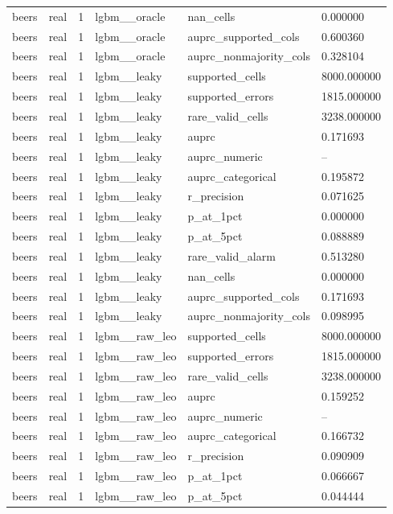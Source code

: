 \begin{tabular}{llllll}
beers & real & 1 & lgbm\_\_oracle & nan\_cells & 0.000000 \\
beers & real & 1 & lgbm\_\_oracle & auprc\_supported\_cols & 0.600360 \\
beers & real & 1 & lgbm\_\_oracle & auprc\_nonmajority\_cols & 0.328104 \\
beers & real & 1 & lgbm\_\_leaky & supported\_cells & 8000.000000 \\
beers & real & 1 & lgbm\_\_leaky & supported\_errors & 1815.000000 \\
beers & real & 1 & lgbm\_\_leaky & rare\_valid\_cells & 3238.000000 \\
beers & real & 1 & lgbm\_\_leaky & auprc & 0.171693 \\
beers & real & 1 & lgbm\_\_leaky & auprc\_numeric & -- \\
beers & real & 1 & lgbm\_\_leaky & auprc\_categorical & 0.195872 \\
beers & real & 1 & lgbm\_\_leaky & r\_precision & 0.071625 \\
beers & real & 1 & lgbm\_\_leaky & p\_at\_1pct & 0.000000 \\
beers & real & 1 & lgbm\_\_leaky & p\_at\_5pct & 0.088889 \\
beers & real & 1 & lgbm\_\_leaky & rare\_valid\_alarm & 0.513280 \\
beers & real & 1 & lgbm\_\_leaky & nan\_cells & 0.000000 \\
beers & real & 1 & lgbm\_\_leaky & auprc\_supported\_cols & 0.171693 \\
beers & real & 1 & lgbm\_\_leaky & auprc\_nonmajority\_cols & 0.098995 \\
beers & real & 1 & lgbm\_\_raw\_leo & supported\_cells & 8000.000000 \\
beers & real & 1 & lgbm\_\_raw\_leo & supported\_errors & 1815.000000 \\
beers & real & 1 & lgbm\_\_raw\_leo & rare\_valid\_cells & 3238.000000 \\
beers & real & 1 & lgbm\_\_raw\_leo & auprc & 0.159252 \\
beers & real & 1 & lgbm\_\_raw\_leo & auprc\_numeric & -- \\
beers & real & 1 & lgbm\_\_raw\_leo & auprc\_categorical & 0.166732 \\
beers & real & 1 & lgbm\_\_raw\_leo & r\_precision & 0.090909 \\
beers & real & 1 & lgbm\_\_raw\_leo & p\_at\_1pct & 0.066667 \\
beers & real & 1 & lgbm\_\_raw\_leo & p\_at\_5pct & 0.044444 \\

\end{tabular}
